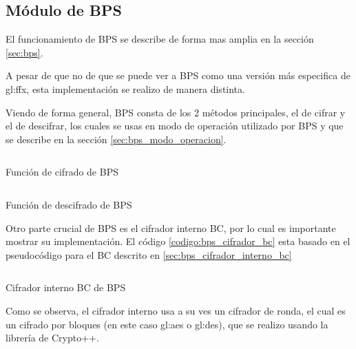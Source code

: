 %
%
%

%
\subsection{Módulo de BPS}

El funcionamiento de BPS se describe de forma mas amplia en la sección
\ref{sec:bps}.

A pesar de que no de que se puede ver a BPS como una versión más especifica de
\gls{gl:ffx}, esta implementación se realizo de manera distinta.

Viendo de forma general, BPS consta de los 2 métodos principales, el de cifrar
y el de descifrar, los cuales se usas en modo de operación utilizado por BPS
y que se describe en la sección \ref{sec:bps_modo_operacion}.

\begin{listing}
  \inputminted[firstline=77, lastline=156]
    {c++}{../implementaciones/bps/cifrador_BPS.cpp}
  \caption{Función de cifrado de BPS}
  \label{codigo:bps_cifrado}
\end{listing}

\begin{listing}
  \inputminted[firstline=158, lastline=250]
    {c++}{../implementaciones/bps/cifrador_BPS.cpp}
  \caption{Función de descifrado de BPS}
  \label{codigo:bps_descifrado}
\end{listing}

Otro parte crucial de BPS es el cifrador interno BC, por lo cual es importante
mostrar su implementación. El código \ref{codigo:bps_cifrador_bc} esta basado
en el pseudocódigo para el BC descrito en \ref{sec:bps_cifrador_interno_bc}

\begin{listing}
  \inputminted[firstline=111, lastline=218]
    {c++}{../implementaciones/bps/cifrador_BC.cpp}
  \caption{Cifrador interno BC de  BPS}
  \label{codigo:bps_cifrador_bc}
\end{listing}

Como se observa, el cifrador interno usa a su ves un cifrador de ronda, el cual
es un cifrado por bloques (en este caso \gls{gl:aes} o \gls{gl:des}), que se
realizo usando la librería de Crypto++.
